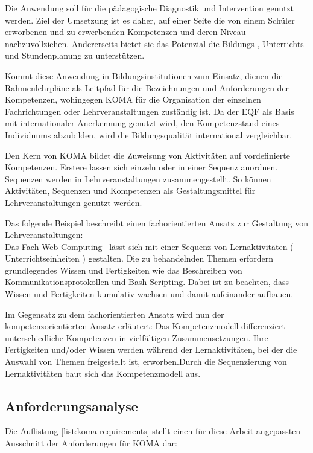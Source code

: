 \documentclass[
12pt,
english,
ngerman,
headsepline,
twoside,
openright,
numbers=noenddot,version=first
]{scrreprt}
\begin{document}
Die Anwendung soll für die pädagogische Diagnostik und Intervention genutzt werden.
Ziel der Umsetzung ist es daher, auf einer Seite die von einem Schüler erworbenen und zu erwerbenden Kompetenzen und deren Niveau nachzuvollziehen. Andererseits bietet sie das Potenzial die Bildungs-, Unterrichts- und Stundenplanung zu unterstützen.

Kommt diese Anwendung in Bildungsinstitutionen zum Einsatz, dienen die Rahmenlehrpläne als Leitpfad für die Bezeichnungen und Anforderungen der Kompetenzen, wohingegen \acrshort{KOMA} für die Organisation der einzelnen Fachrichtungen oder Lehrveranstaltungen zuständig ist. Da der \acrshort{EQF} als Basis mit internationaler Anerkennung genutzt wird, den Kompetenzstand eines Individuums abzubilden, wird die Bildungsqualität international vergleichbar.

Den Kern von \acrshort{KOMA} bildet die Zuweisung von Aktivitäten auf vordefinierte Kompetenzen. Erstere lassen sich einzeln oder in einer Sequenz anordnen. Sequenzen werden in Lehrveranstaltungen zusammengestellt. So können Aktivitäten, Sequenzen und Kompetenzen als Gestaltungsmittel für Lehrveranstaltungen genutzt werden. 


Das folgende Beispiel beschreibt einen fachorientierten Ansatz zur Gestaltung von Lehrveranstaltungen:\\
Das Fach \glqq Web Computing \grqq\ lässt sich mit einer Sequenz von Lernaktivitäten ( Unterrichtseinheiten ) gestalten. Die zu behandelnden Themen erfordern grundlegendes Wissen und Fertigkeiten wie das Beschreiben von Kommunikationsprotokollen und Bash Scripting. Dabei ist zu beachten, dass Wissen und Fertigkeiten kumulativ wachsen und damit aufeinander aufbauen.

Im Gegensatz zu dem fachorientierten Ansatz wird nun der kompetenzorientierten Ansatz erläutert:
Das Kompetenzmodell differenziert unterschiedliche Kompetenzen in vielfältigen Zusammensetzungen. Ihre Fertigkeiten und/oder Wissen werden während der  Lernaktivitäten, bei der die Auswahl von Themen freigestellt ist, erworben.Durch die Sequenzierung von Lernaktivitäten baut sich das Kompetenzmodell aus.


\subsection{Anforderungsanalyse}
Die Auflistung \autoref{list:koma-requirements} stellt einen für diese Arbeit angepassten Ausschnitt der Anforderungen für \acrshort{KOMA} dar:
\end{document}
